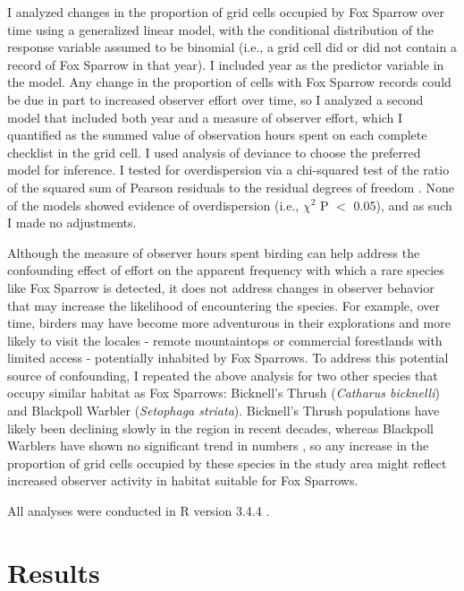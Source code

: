 \documentclass[fleqn,10pt,lineno]{wlpeerj} %
\begin{document}
I analyzed changes in the proportion of grid cells occupied by Fox Sparrow over time using a generalized linear model, with the conditional distribution of the response variable assumed to be binomial (i.e., a grid cell did or did not contain a record of Fox Sparrow in that year). I included year as the predictor variable in the model. Any change in the proportion of cells with Fox Sparrow records could be due in part to increased observer effort over time, so I analyzed a second model that included both year and a measure of observer effort, which I quantified as the summed value of observation hours spent on each complete checklist in the grid cell. I used analysis of deviance to choose the preferred model for inference. I tested for overdispersion via a chi-squared test of the ratio of the squared sum of Pearson residuals to the residual degrees of freedom \citep{Venables2002-gt}. None of the models showed evidence of overdispersion (i.e., $\chi^2$ P ${<}$ 0.05), and as such I made no adjustments. 

Although the measure of observer hours spent birding can help address the confounding effect of effort on the apparent frequency with which a rare species like Fox Sparrow is detected, it does not address changes in observer behavior that may increase the likelihood of encountering the species. For example, over time, birders may have become more adventurous in their explorations and more likely to visit the locales - remote mountaintops or commercial forestlands with limited access - potentially inhabited by Fox Sparrows. To address this potential source of confounding, I repeated the above analysis for two other species that occupy similar habitat as Fox Sparrows: Bicknell’s Thrush (\textit{Catharus bicknelli}) and Blackpoll Warbler (\textit{Setophaga striata}). Bicknell’s Thrush populations have likely been declining slowly in the region \citep{Lambert2008-jj,King2008-qx} in recent decades, whereas Blackpoll Warblers have shown no significant trend in numbers \citep{King2008-qx}, so any increase in the proportion of grid cells occupied by these species in the study area might reflect increased observer activity in habitat suitable for Fox Sparrows. 

All analyses were conducted in R version 3.4.4 \citep{R_Core_Team2018-cc}. 

\section*{Results}
\end{document}
